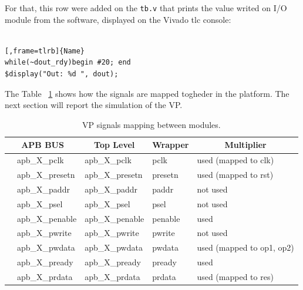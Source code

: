 \documentclass[]{IEEEtran}
\begin{document}
For that, this row were added on the \verb|tb.v| that prints the value writed on I/O module from the software, displayed on the Vivado tlc console:
\\
\\
\noindent
\begin{minipage}{.45\textwidth}
	\begin{lstlisting}[,frame=tlrb]{Name}
while(~dout_rdy)begin #20; end
$display("Out: %d ", dout);
	\end{lstlisting}
\end{minipage}\hfill
The Table ~\ref{vpmapping} shows how the signals are mapped togheder in the platform. The next section will report the simulation of the VP.

\begin{table}[]
\begin{tabular}{@{}lllll@{}}
	\toprule
	\multicolumn{2}{c}{APB BUS} & \multicolumn{1}{c}{Top Level} & \multicolumn{1}{c}{Wrapper} & \multicolumn{1}{c}{Multiplier} \\ \midrule
	& apb\_X\_pclk        & apb\_X\_pclk                  & pclk                        & used (mapped to clk)           \\
	& apb\_X\_presetn     & apb\_X\_presetn               & presetn                     & used (mapped to rst)           \\
	& apb\_X\_paddr       & apb\_X\_paddr                 & paddr                       & not used                       \\
	& apb\_X\_psel        & apb\_X\_psel                  & psel                        & not used                       \\
	& apb\_X\_penable     & apb\_X\_penable               & penable                     & used                           \\
	& apb\_X\_pwrite      & apb\_X\_pwrite                & pwrite                      & not used                       \\
	& apb\_X\_pwdata      & apb\_X\_pwdata                & pwdata                      & used (mapped to op1, op2)      \\
	& apb\_X\_pready      & apb\_X\_pready                & pready                      & used                           \\
	& apb\_X\_prdata      & apb\_X\_prdata                & prdata                      & used (mapped to res)           \\ \bottomrule
\end{tabular}
	\centering
	\caption{VP signals mapping between modules.}
	\label{vpmapping}
\end{table}
\end{document}

